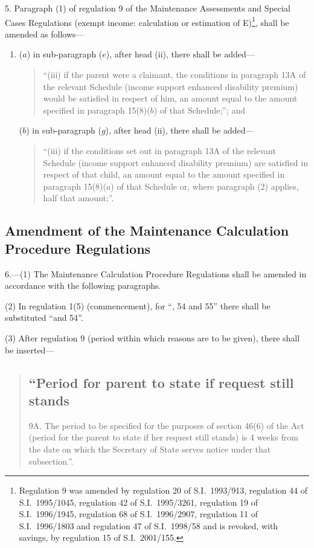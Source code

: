 \documentclass[12pt,a4paper]{article}
\begin{document}
5.  Paragraph (1) of regulation 9 of the Maintenance Assessments and Special Cases Regulations (exempt income: calculation or estimation of E)\footnote{Regulation 9 was amended by regulation 20 of S.I.\ 1993/913, regulation 44 of S.I.\ 1995/1045, regulation 42 of S.I.\ 1995/3261, regulation 19 of S.I.\ 1996/1945, regulation 68 of S.I.\ 1996/2907, regulation 11 of S.I.\ 1996/1803 and regulation 47 of S.I.\ 1998/58 and is revoked, with savings, by regulation 15 of S.I.\ 2001/155.}, shall be amended as follows—
\begin{enumerate}\item[]
($a$) in sub-paragraph ($e$), after head (ii), there shall be added—
\begin{quotation}
“(iii) if the parent were a claimant, the conditions in paragraph 13A of the relevant Schedule (income support enhanced disability premium) would be satisfied in respect of him, an amount equal to the amount specified in paragraph 15(8)($b$)  of that Schedule;”; and
\end{quotation}

($b$) in sub-paragraph ($g$), after head (ii), there shall be added—
\begin{quotation}
“(iii) if the conditions set out in paragraph 13A of the relevant Schedule (income support enhanced disability premium) are satisfied in respect of that child, an amount equal to the amount specified in paragraph 15(8)($a$)  of that Schedule or, where paragraph (2) applies, half that amount;”.
\end{quotation}
\end{enumerate}

\subsection[6. Amendment of the Maintenance Calculation Procedure Regulations]{Amendment of the Maintenance Calculation Procedure Regulations}

6.---(1)  The Maintenance Calculation Procedure Regulations shall be amended in accordance with the following paragraphs.

(2) In regulation 1(5) (commencement), for “, 54 and 55” there shall be substituted “and 54”.

(3) After regulation 9 (period within which reasons are to be given), there shall be inserted—
\begin{quotation}
\subsection*{“Period for parent to state if request still stands}

9A.  The period to be specified for the purposes of section 46(6) of the Act (period for the parent to state if her request still stands) is 4 weeks from the date on which the Secretary of State serves notice under that subsection.”.
\end{quotation}
\end{document}
